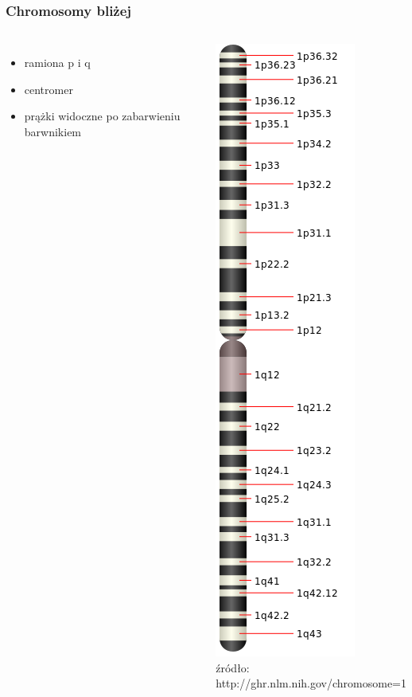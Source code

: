 \documentclass[table]{beamer}
\begin{document}
\begin{frame}\frametitle{Chromosomy bliżej}
 \begin{columns}    
\begin{itemize}
\item ramiona p i q
\item centromer
\item prążki widoczne po zabarwieniu barwnikiem
\end{itemize}

	    \begin{center}
	   \includegraphics[width=0.3 \textwidth]{SER-images/Chromosome_1.png}\\
	   \tiny{źródło: http://ghr.nlm.nih.gov/chromosome=1}  
	    \end{center}
\end{columns}
\end{frame}
\end{document}
